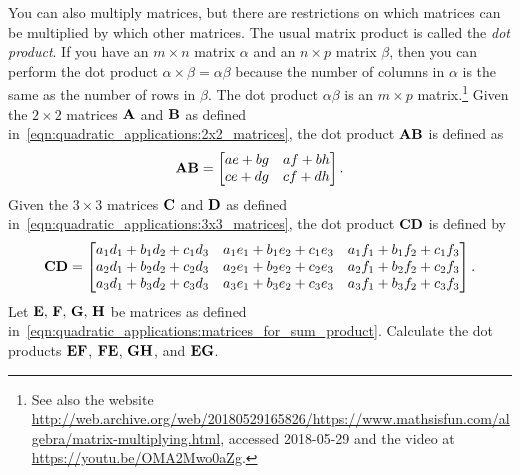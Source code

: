 \documentclass[a4paper,oneside,12pt]{article}
\begin{document}
\begin{problem}
\begin{packedenum}
  \item\label{subprob:quadratic_applications:matrix_product}
    You can also multiply matrices, but there are restrictions on
    which matrices can be multiplied by which other matrices.  The
    usual matrix product is called the \emph{dot product}.  If you
    have an $m \times n$ matrix $\alpha$ and an $n \times p$ matrix
    $\beta$, then you can perform the dot product
    $\alpha \times \beta = \alpha\beta$ because the number of columns
    in $\alpha$ is the same as the number of rows in $\beta$.  The dot
    product $\alpha\beta$ is an $m \times p$ matrix.\footnote{
      See also the website
      \url{http://web.archive.org/web/20180529165826/https://www.mathsisfun.com/algebra/matrix-multiplying.html},
      accessed 2018-05-29 and the video at
      \url{https://youtu.be/OMA2Mwo0aZg}.
    }
    Given the $2 \times 2$ matrices $\textbf{A}$ and $\textbf{B}$ as defined
    in~\eqref{eqn:quadratic_applications:2x2_matrices}, the dot
    product $\textbf{A} \textbf{B}$ is defined as
    \[
    \textbf{A} \textbf{B}
    =
    \begin{bmatrix}
    ae + bg & af + bh \\
    ce + dg & cf + dh
    \end{bmatrix}.
    \]
    Given the $3 \times 3$ matrices $\textbf{C}$ and $\textbf{D}$ as defined
    in~\eqref{eqn:quadratic_applications:3x3_matrices}, the dot
    product $\textbf{C} \textbf{D}$ is defined by
    \[
    \textbf{C} \textbf{D}
    =
    \begin{bmatrix}
    a_1d_1 + b_1d_2 + c_1d_3 & a_1e_1 + b_1e_2 + c_1e_3 & a_1f_1 + b_1f_2 + c_1f_3 \\
    a_2d_1 + b_2d_2 + c_2d_3 & a_2e_1 + b_2e_2 + c_2e_3 & a_2f_1 + b_2f_2 + c_2f_3 \\
    a_3d_1 + b_3d_2 + c_3d_3 & a_3e_1 + b_3e_2 + c_3e_3 & a_3f_1 + b_3f_2 + c_3f_3
    \end{bmatrix}.
    \]
    Let ${\textbf{E}},\, {\textbf{F}},\, {\textbf{G}},\, {\textbf{H}}$ be matrices as
    defined
    in~\eqref{eqn:quadratic_applications:matrices_for_sum_product}.
    Calculate the dot products $\textbf{E} \textbf{F}$, $\textbf{F} \textbf{E}$,
    $\textbf{G} \textbf{H}$, and $\textbf{E} \textbf{G}$.


\end{packedenum}
\end{problem}
\end{document}
